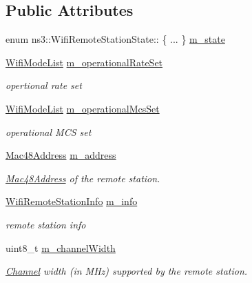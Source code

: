 \subsection*{Public Attributes}
\begin{DoxyCompactItemize}
\item 
enum ns3\+::\+Wifi\+Remote\+Station\+State\+:: \{ ... \}  \hyperlink{structns3_1_1WifiRemoteStationState_acfd204dd86b1e3812f594f0417f3f9d1}{m\+\_\+state}
\item 
\hyperlink{namespacens3_abceecb3f813d2b4af697068f25085024}{Wifi\+Mode\+List} \hyperlink{structns3_1_1WifiRemoteStationState_a89e0f91eb71691158e527dd778aded0e}{m\+\_\+operational\+Rate\+Set}
\begin{DoxyCompactList}\small\item\em opertional rate set \end{DoxyCompactList}\item 
\hyperlink{namespacens3_abceecb3f813d2b4af697068f25085024}{Wifi\+Mode\+List} \hyperlink{structns3_1_1WifiRemoteStationState_a8b765ada4277cdbe684be85ccc974e60}{m\+\_\+operational\+Mcs\+Set}
\begin{DoxyCompactList}\small\item\em operational M\+CS set \end{DoxyCompactList}\item 
\hyperlink{classns3_1_1Mac48Address}{Mac48\+Address} \hyperlink{structns3_1_1WifiRemoteStationState_a17c3bd748f6f57ecd9e82beacce3adba}{m\+\_\+address}
\begin{DoxyCompactList}\small\item\em \hyperlink{classns3_1_1Mac48Address}{Mac48\+Address} of the remote station. \end{DoxyCompactList}\item 
\hyperlink{classns3_1_1WifiRemoteStationInfo}{Wifi\+Remote\+Station\+Info} \hyperlink{structns3_1_1WifiRemoteStationState_ad094b9d6012f9e03d3b10ff382d5c0eb}{m\+\_\+info}
\begin{DoxyCompactList}\small\item\em remote station info \end{DoxyCompactList}\item 
uint8\+\_\+t \hyperlink{structns3_1_1WifiRemoteStationState_a05f3669bfd023b4cf9c43b3cf7de36cb}{m\+\_\+channel\+Width}
\begin{DoxyCompactList}\small\item\em \hyperlink{classns3_1_1Channel}{Channel} width (in M\+Hz) supported by the remote station. \end{DoxyCompactList}\item 

\end{DoxyCompactItemize}
